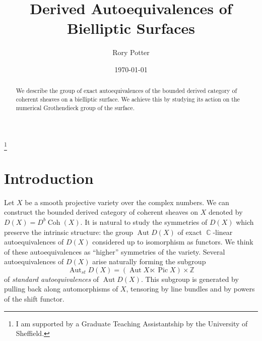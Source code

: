 \documentclass[a4paper, 12pt, twoside]{amsart}
\theoremstyle{plain}
\theoremstyle{definition}
\DeclareMathOperator{\Pic}{Pic}
\DeclareMathOperator{\Aut}{Aut}
\DeclareMathOperator{\Coh}{Coh}
\DeclareMathOperator{\C}{\mathbb{C}}
\begin{document}
\title{Derived Autoequivalences of Bielliptic Surfaces}

\author{Rory Potter}

\address{School of Mathematics and Statistics, University of
  Sheffield, Hicks Building, Hounsfield road, Sheffield, South
  Yorkshire, S3 7RH}

\date{\today}

\begin{abstract}
  We describe the group of exact autoequivalences of the bounded
  derived category of coherent sheaves on a bielliptic surface. We
  achieve this by studying its action on the numerical Grothendieck
  group of the surface.
\end{abstract}

\thanks{I am supported by a Graduate Teaching Assistantship by the
  University of Sheffield.}
\maketitle

\section{Introduction}
\label{sec:intro}

Let $X$ be a smooth projective variety over the complex numbers. We
can construct the bounded derived category of coherent sheaves on $X$
denoted by $D(X) = D^b\Coh(X)$. It is natural to study the symmetries
of $D(X)$ which preserve the intrinsic structure: the group
$\Aut D(X)$ of exact $\C$-linear autoequivalences of $D(X)$ considered
up to isomorphism as functors. We think of these autoequivalences as
``higher'' symmetries of the variety. Several autoequivalences of
$D(X)$ arise naturally forming the subgroup
\[
\Aut_{st} D(X) = \left( \Aut X \ltimes \Pic X \right) \times \mathbb{Z}
\]
of \emph{standard autoequivalences} of $\Aut D(X)$. This subgroup is
generated by pulling back along automorphisms of $X$, tensoring by
line bundles and by powers of the shift functor.
\end{document}
